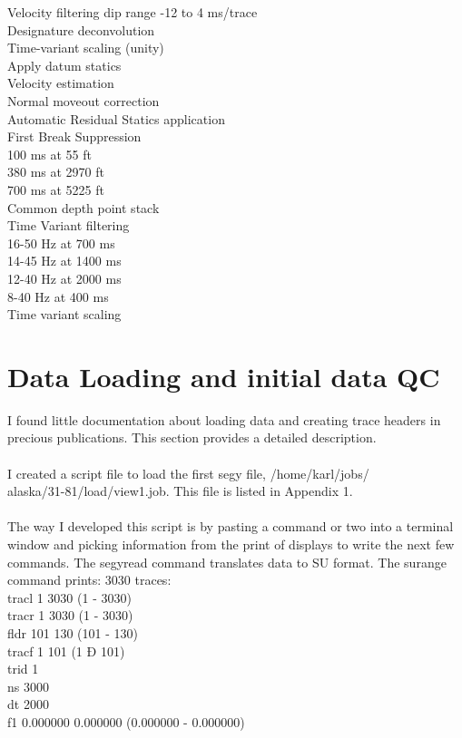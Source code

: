 Velocity filtering dip range -12 to 4 ms/trace\\
Designature deconvolution\\
Time-variant scaling (unity)\\
Apply datum statics\\
Velocity estimation\\
Normal moveout correction\\
Automatic Residual Statics application\\
First Break Suppression\\
100 ms at 55 ft\\
380 ms at 2970 ft\\
700 ms at 5225 ft\\
Common depth point stack\\
Time Variant filtering\\
16-50 Hz at 700 ms\\
14-45 Hz at 1400 ms\\
12-40 Hz at 2000 ms\\
8-40 Hz at 400 ms\\
Time variant scaling\\


\section{Data Loading and initial data QC}
I found little documentation about loading data and creating trace headers in precious publications.  This section provides a detailed description.\\
\\
I created a script file to load the first segy file, /home/karl/jobs/\\
alaska/31-81/load/view1.job.  This file is listed in Appendix 1.\\
\\
The way I developed this script is by pasting a command or two into a terminal window and picking information from the print of displays to write the next few commands.  The segyread command translates data to SU format.  The surange command prints:
3030 traces:\\

tracl   1 3030 (1 - 3030)\\
tracr    1 3030 (1 - 3030)\\
fldr     101 130 (101 - 130)\\
tracf   1 101 (1 Ð 101)\\
trid     1\\
ns       3000\\
dt       2000\\
f1       0.000000 0.000000 (0.000000 - 0.000000)\\

